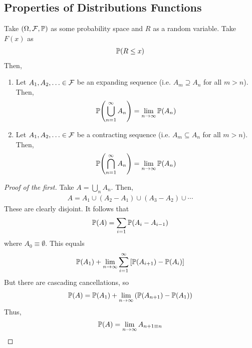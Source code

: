 \subsection{Properties of Distributions Functions}
Take $(\Omega, \mathcal{F}, \mathbb{P})$ as some probability space and $R$ as a random variable. Take $F(x)$ as
\begin{align}
    \mathbb{P}(R \le x)
\end{align}
Then,
\begin{proposition}
    \begin{enumerate}
        \item Let $A_1, A_2, \ldots \in \mathcal{F}$ be an expanding sequence (i.e. $A_m \supseteq A_n$ for all $m > n$). Then,
        \begin{align}
            \mathbb{P}\qty(\bigcup_{n=1}^\infty A_n) = \lim_{n\to\infty} \mathbb{P}(A_n)
        \end{align}
        \item Let $A_1, A_2, \ldots \in \mathcal{F}$ be a contracting sequence (i.e. $A_m \subseteq A_n$ for all $m > n$). Then,
        \begin{align}
            \mathbb{P}\qty(\bigcap_{n=1}^\infty A_n) = \lim_{n\to\infty} \mathbb{P}(A_n)
        \end{align}
    \end{enumerate}
\end{proposition}
\begin{proof}[Proof of the first]
    Take $A = \bigcup_{n} A_n$. Then,
    \begin{align}
        A = A_1 \cup (A_2 - A_1) \cup (A_3 - A_2) \cup \cdots
    \end{align}
    These are clearly disjoint. It follows that
    \begin{align}
        \mathbb{P}(A) = \sum_{i=1} \mathbb{P}(A_i - A_{i-1})
    \end{align}
    where $A_0 \equiv \emptyset$. This equals
    \begin{align}
        \mathbb{P}(A_1) + \lim_{n\to\infty} \sum_{i=1}^\infty \qty[\mathbb{P}(A_{i+1}) - \mathbb{P}(A_i)]
    \end{align}
    But there are cascading cancellations, so
    \begin{align}
        \mathbb{P}(A) = \mathbb{P}(A_1) + \lim_{n \to \infty} \left( \mathbb{P}(A_{n+1}) - \mathbb{P}(A_1) \right)
    \end{align}
    Thus,
    \begin{align}
        \mathbb{P}(A) = \lim_{n \to \infty} A_{n+1 \equiv n}
    \end{align}
\end{proof}

